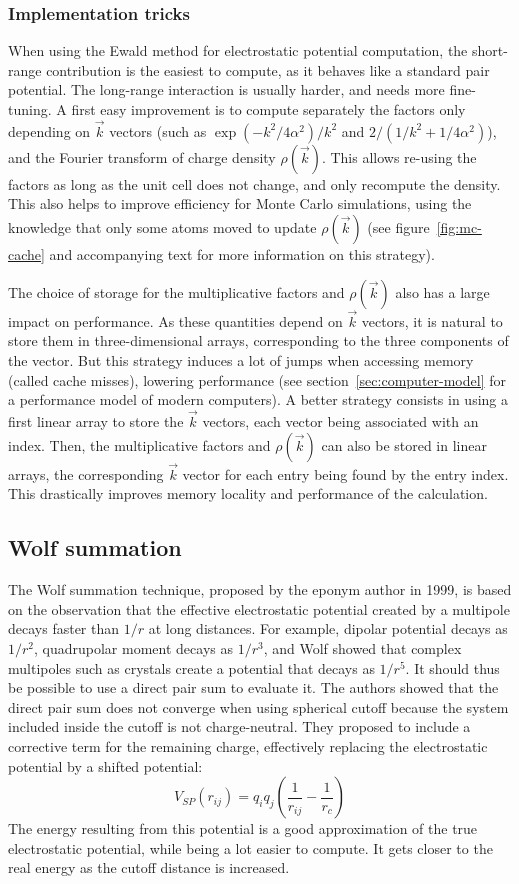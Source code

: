 \documentclass[thesis]{subfiles}
\begin{document}
\subsubsection{Implementation tricks}

When using the Ewald method for electrostatic potential computation, the
short-range contribution is the easiest to compute, as it behaves like a
standard pair potential. The long-range interaction is usually harder, and needs
more fine-tuning. A first easy improvement is to compute separately the factors
only depending on $\vec k$ vectors (such as $\exp(-k^2/4\alpha^2) / k^2$ and $2
/ (1 / k^2 + 1/4\alpha^2)$), and the Fourier transform of charge density
$\rho(\vec k)$. This allows re-using the factors as long as the unit cell does
not change, and only recompute the density. This also helps to improve
efficiency for Monte Carlo simulations, using the knowledge that only some atoms
moved to update $\rho(\vec k)$ (see figure~\ref{fig:mc-cache} and accompanying
text for more information on this strategy).

The choice of storage for the multiplicative factors and $\rho(\vec k)$ also has
a large impact on performance. As these quantities depend on $\vec k$ vectors,
it is natural to store them in three-dimensional arrays, corresponding to the
three components of the vector. But this strategy induces a lot of jumps when
accessing memory (called cache misses), lowering performance (see
section~\ref{sec:computer-model} for a performance model of modern computers).
A better strategy consists in using a first linear array to store the $\vec k$
vectors, each vector being associated with an index. Then, the multiplicative
factors and $\rho(\vec k)$ can also be stored in linear arrays, the
corresponding $\vec k$ vector for each entry being found by the entry index.
This drastically improves memory locality and performance of the calculation.

\subsection{Wolf summation}

The Wolf summation technique, proposed by the eponym author in
1999\cite{Wolf1999}, is based on the observation that the effective
electrostatic potential created by a multipole decays faster than $1/r$ at long
distances. For example, dipolar potential decays as $1/r^2$, quadrupolar moment
decays as $1/r^3$, and Wolf showed that complex multipoles such as crystals
create a potential that decays as $1/r^5$. It should thus be possible to use a
direct pair sum to evaluate it. The authors showed that the direct pair sum does
not converge when using spherical cutoff because the system included inside the
cutoff is not charge-neutral. They proposed to include a corrective term for the
remaining charge, effectively replacing the electrostatic potential by a shifted
potential:
\[V_{SP}(r_{ij}) = q_i q_j \left(\frac{1}{r_{ij}} - \frac{1}{r_c} \right)\]
The energy resulting from this potential is a good approximation of the true
electrostatic potential, while being a lot easier to compute. It gets closer to
the real energy as the cutoff distance is increased.
\end{document}
